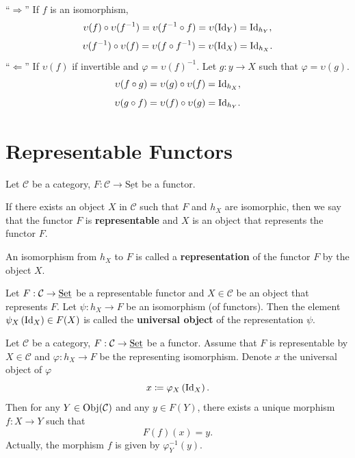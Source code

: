 \begin{proofenv}\quad \newline
    ``$\Rightarrow$'' If $f$ is an isomorphism,
    $$ \upsilon(f)\circ \upsilon(f^{-1}) = \upsilon(f^{-1}\circ f) = \upsilon(\mathrm{Id}_Y) = \mathrm{Id}_{h_Y},$$
    $$ \upsilon(f^{-1})\circ \upsilon(f) = \upsilon(f\circ f^{-1}) = \upsilon(\mathrm{Id}_X) =\mathrm{Id}_{h_X}.$$
    ``$\Leftarrow$'' If $\upsilon(f)$ if invertible and $\varphi = \upsilon(f)^{-1}$. Let $g:y\rightarrow X$ such that $\varphi=\upsilon(g)$.
    $$\upsilon(f\circ g) =\upsilon(g)\circ \upsilon(f) =\mathrm{Id}_{h_X},$$
    $$\upsilon(g\circ f) = \upsilon(f)\circ \upsilon(g) = \mathrm{Id}_{h_Y}.$$
\end{proofenv}

\section{Representable Functors}
\begin{definitionenv}
    Let $\mathcal{C}$ be a category, $F:\mathcal{C}\rightarrow\underline{\mathrm{Set}}$ be a functor.
    
    \quad If there exists an object $X$ in $\mathcal{C}$ such that $F$ and $h_X$ are isomorphic, then we say that the functor $F$ is \textbf{representable} and $X$ is an object that represents the functor $F$.
    
    \quad An isomorphism from $h_X$ to $F$ is called a \textbf{representation} of the functor $F$ by the object $X$.

    \quad Let $F:\mathcal{C}\rightarrow \underline{\mathrm{Set}}$ be a representable functor and $X\in \mathcal{C}$ be an object that represents $F$. Let $\psi: h_X\rightarrow F$ be an isomorphism (of functors). Then the element $\psi_X\left(\mathrm{Id}_X\right)\in F(X)$ is called the \textbf{universal object} of the representation $\psi$.
\end{definitionenv}
\begin{propositionenv}\label{1.5.2}
    Let $\mathcal{C}$ be a category, $F:\mathcal{C}\rightarrow\underline{\mathrm{Set}}$ be a functor. Assume that $F$ is representable by $X\in \mathcal{C}$ and $\varphi:h_X \rightarrow F$ be the representing isomorphism. Denote $x$ the universal object of $\varphi$
    $$ x\coloneq \varphi_X\left(\mathrm{Id}_X\right).$$
    Then for any $Y\in \mathrm{Obj}(\mathcal{C})$ and any $y\in F(Y)$, there exists a unique morphism $f:X\rightarrow Y$ such that
    $$
    F(f)(x) = y.
    $$
    Actually, the morphism $f$ is given by $\varphi^{-1}_{Y}(y)$.
\end{propositionenv}
